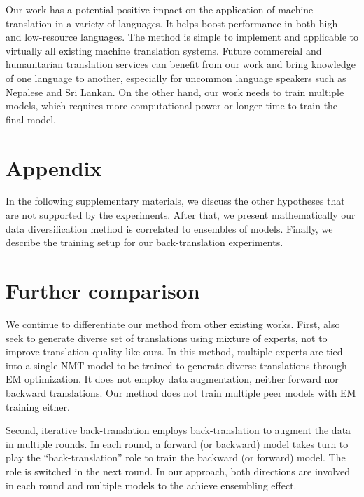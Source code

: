 \documentclass{article}
\begin{document}
Our work has a potential positive impact on the application of machine translation in a variety of languages. It helps boost performance in both high- and low-resource languages. The method is simple to implement and applicable to virtually all existing machine translation systems. Future commercial and humanitarian translation services can benefit from our work and bring knowledge of one language to another, especially for uncommon language speakers such as Nepalese and Sri Lankan. On the other hand, our work needs to train multiple models, which requires more computational power or longer time to train the final model.





\newpage
\appendix
\section{Appendix}\label{sec:appendix}



{In the following supplementary materials, we discuss the other hypotheses that are not supported by the experiments. 
After that, we present mathematically our data diversification method is correlated to ensembles of models.
Finally, we describe the training setup for our back-translation experiments.} 

\section{Further comparison}\label{app:compare}
We continue to differentiate our method from other existing works. First, \citet{mixture_model_nmt_shen2019} also seek to generate diverse set of translations using mixture of experts, not to improve translation quality like ours. In this method, multiple experts are tied into a single NMT model to be trained to generate diverse translations through EM optimization. It does not employ data augmentation, neither forward nor backward translations. Our method does not train multiple peer models with EM training either. 

Second, iterative back-translation \citep{iterative-hoang-etal-2018} employs back-translation to augment the data in multiple rounds. In each round, a forward (or backward) model takes turn to play the ``back-translation'' role to train the backward (or forward) model. The role is switched in the next round. In our approach, both directions are involved in each round and multiple models to the achieve ensembling effect.
\end{document}
